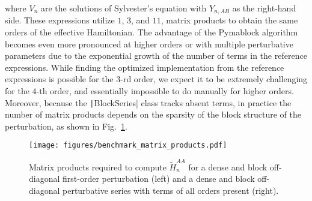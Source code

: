 where $V_{n}$ are the solutions of Sylvester's equation with $Y_{n,AB}$ as the right-hand side.
These expressions utilize $1$, $3$, and $11$, matrix products to obtain the same orders of the effective Hamiltonian.
The advantage of the Pymablock algorithm becomes even more pronounced at higher orders or with multiple perturbative parameters due to the exponential growth of the number of terms in the reference expressions.
While finding the optimized implementation from the reference expressions is possible for the $3$-rd order, we expect it to be extremely challenging for the $4$-th order, and essentially impossible to do manually for higher orders.
Moreover, because the \texttt|BlockSeries| class tracks absent terms, in practice the number of matrix products depends on the sparsity of the block structure of the perturbation, as shown in Fig.~\ref{fig:benchmark_matrix_products}.
%
\begin{figure}[h]
    \centering
    \texttt{[image: figures/benchmark\_matrix\_products.pdf]}
    \caption{
        Matrix products required to compute $\tilde{H}^{AA}_{n}$ for
        a dense and block off-diagonal first-order perturbation (left) and a dense and block off-diagonal perturbative series with terms of all orders present (right).
        }
    \label{fig:benchmark_matrix_products}
\end{figure}
%

